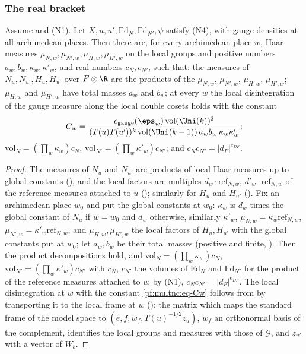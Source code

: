 \subsubsection*{The real bracket}

\begin{lemma}\label{pf:multnc:placesplit}
Assume  and (N1). Let $X,u,u',\mathrm{Fd}_N,\mathrm{Fd}_{N'},\psi$ satisfy (N4), with gauge densities at all
archimedean places. Then there are, for every archimedean place $w$, Haar measures $\mu_{N,w},\mu_{N',w},\mu_{H,w},
\mu_{H',w}$ on the local groups and positive numbers $a_w,b_w,\kappa_w,\kappa'_w$, and real numbers $c_N,c_{N'}$, such that:
the measures of $N_u,N_{u'},H_u,H_{u'}$ over $F\otimes\R$ are the products of the $\mu_{N,w}$, $\mu_{N',w}$, $\mu_{H,w}$,
$\mu_{H',w}$; $\mu_{H,w}$ and $\mu_{H',w}$ have total masses $a_w$ and $b_w$; at every $w$ the local disintegration of the
gauge measure along the local double cosets holds with the constant
\begin{equation}\label{pf:multnc:eq-Cw}
C_w=\frac{c_{\mathrm{gauge}}(\eps_w)\,\mathrm{vol}(\Uni(k))^2}{(T(u)T(u'))^k\,\mathrm{vol}(\Uni(k-1))\,a_wb_w\,\kappa_w
\kappa'_w};
\end{equation}
$\mathrm{vol}_N=(\prod_w\kappa_w)c_N$, $\mathrm{vol}_{N'}=(\prod_w\kappa'_w)c_{N'}$; and $c_Nc_{N'}=|d_F|^{e_{DF}}$.
\end{lemma}

\begin{proof}
The measures of $N_u$ and $N_{u'}$ are products of local Haar measures up to global constants
(), and the local factors are multiples
$d_w\cdot\mathrm{ref}_{N,w}$, $d'_w\cdot\mathrm{ref}_{N,w}$ of the reference measures attached to $u$
(); similarly for $H_u$ and $H_{u'}$
(). Fix an archimedean place $w_0$ and put the global
constants at $w_0$: $\kappa_w$ is $d_w$ times the global constant of $N_u$ if $w=w_0$ and $d_w$ otherwise, similarly
$\kappa'_w$, $\mu_{N,w}=\kappa_w\mathrm{ref}_{N,w}$, $\mu_{N',w}=\kappa'_w\mathrm{ref}_{N,w}$, and $\mu_{H,w},\mu_{H',w}$
the local factors of $H_u,H_{u'}$ with the global constants put at $w_0$; let $a_w,b_w$ be their total masses (positive and
finite, ). Then the product decompositions hold, and
$\mathrm{vol}_N=(\prod_w\kappa_w)c_N$, $\mathrm{vol}_{N'}=(\prod_w\kappa'_w)c_{N'}$ with $c_N$, $c_{N'}$ the volumes of
$\mathrm{Fd}_N$ and $\mathrm{Fd}_{N'}$ for the product of the reference measures attached to $u$; by (N1),
$c_Nc_{N'}=|d_F|^{e_{DF}}$. The local disintegration at $w$ with the constant \eqref{pf:multnc:eq-Cw} follows from
 by transporting it to the local frame at $w$ (): the matrix
which maps the standard frame of the model space to $(e,f,w_f,T(u)^{-1/2}z_u)$, $w_f$ an orthonormal basis of the
complement, identifies the local groups and measures with those of $\mathcal G$, and $z_{u'}$ with a vector of $W_b$.
\end{proof}

